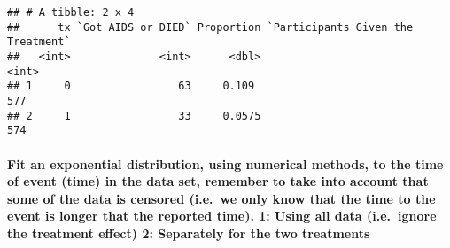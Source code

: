 \documentclass[
]{article}
\begin{document}
\begin{verbatim}
## # A tibble: 2 x 4
##      tx `Got AIDS or DIED` Proportion `Participants Given the Treatment`
##   <int>              <int>      <dbl>                              <int>
## 1     0                 63     0.109                                 577
## 2     1                 33     0.0575                                574
\end{verbatim}

\hypertarget{fit-an-exponential-distribution-using-numerical-methods-to-the-time-of-event-time-in-the-data-set-remember-to-take-into-account-that-some-of-the-data-is-censored-i.e.-we-only-know-that-the-time-to-the-event-is-longer-that-the-reported-time.-1-using-all-data-i.e.-ignore-the-treatment-effect-2-separately-for-the-two-treatments}{%
\paragraph{Fit an exponential distribution, using numerical methods, to
the time of event (time) in the data set, remember to take into account
that some of the data is censored (i.e.~we only know that the time to
the event is longer that the reported time). 1: Using all data
(i.e.~ignore the treatment effect) 2: Separately for the two
treatments}\label{fit-an-exponential-distribution-using-numerical-methods-to-the-time-of-event-time-in-the-data-set-remember-to-take-into-account-that-some-of-the-data-is-censored-i.e.-we-only-know-that-the-time-to-the-event-is-longer-that-the-reported-time.-1-using-all-data-i.e.-ignore-the-treatment-effect-2-separately-for-the-two-treatments}}
\end{document}
